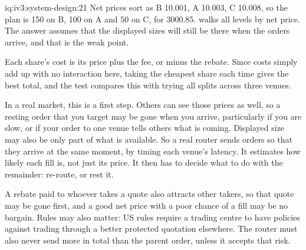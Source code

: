\begin{solution}{iq:iv3:system-design:21}
Net prices sort as B 10.001, A 10.003, C 10.008, so the plan is 150 on B, 100 on A and 50 on C, for 3000.85.  walks all levels by net price. The answer assumes that the displayed sizes will still be there when the orders arrive, and that is the weak point.
\enlargethispage{-3\baselineskip}%
\label{lst:iv3:sd:route}

Each share's cost is its price plus the fee, or minus the rebate. Since costs simply add up with no interaction here, taking the cheapest share each time gives the best total, and the test compares this with trying all splits across three venues.

In a real market, this is a first step. Others can see those prices as well, so a resting order that you target may be gone when you arrive, particularly if you are slow, or if your order to one venue tells others what is coming. Displayed size may also be only part of what is available. So a real router sends orders so that they arrive at the same moment, by timing each venue's latency. It estimates how likely each fill is, not just its price. It then has to decide what to do with the remainder: re-route, or rest it.

A rebate paid to whoever takes a quote also attracts other takers, so that quote may be gone first, and a good net price with a poor chance of a fill may be no bargain. Rules may also matter: US rules require a trading centre to have policies against trading through a better protected quotation elsewhere. The router must also never send more in total than the parent order, unless it accepts that risk.

\end{solution}

